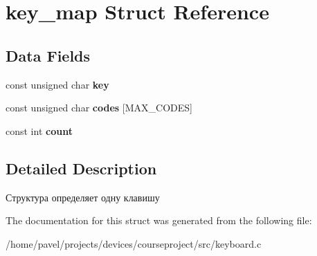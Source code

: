 \section{key\-\_\-map Struct Reference}
\label{structkey__map}
\subsection*{Data Fields}
\begin{DoxyCompactItemize}
\item 
const unsigned char {\bfseries key}\label{structkey__map_aacbce9c497884ba3ada3114b443bbff7}

\item 
const unsigned char {\bfseries codes} [M\-A\-X\-\_\-\-C\-O\-D\-E\-S]\label{structkey__map_a1564a27d26bcba4bb8f924eb2e7e70ca}

\item 
const int {\bfseries count}\label{structkey__map_ada8f9c34ea6de0264c2d808acf540ad2}

\end{DoxyCompactItemize}


\subsection{Detailed Description}
Структура определяет одну клавишу 

The documentation for this struct was generated from the following file\-:\begin{DoxyCompactItemize}
\item 
/home/pavel/projects/devices/courseproject/src/keyboard.\-c\end{DoxyCompactItemize}
